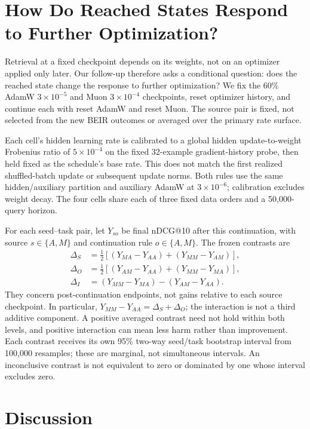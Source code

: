 \documentclass[11pt]{article}
\begin{document}
\section{How Do Reached States Respond to Further Optimization?}

Retrieval at a fixed checkpoint depends on its weights, not on an optimizer applied only later.
Our follow-up therefore asks a conditional question: does the reached state change the response to
further optimization? We fix the 60\% AdamW $3\!\times\!10^{-5}$ and Muon $3\!\times\!10^{-4}$
checkpoints, reset optimizer history, and continue each with reset AdamW and reset Muon. The source
pair is fixed, not selected from the new BEIR outcomes or averaged over the primary rate surface.

Each cell's hidden learning rate is calibrated to a global hidden update-to-weight Frobenius ratio
of $5\!\times\!10^{-4}$ on the fixed 32-example gradient-history probe, then held fixed as the
schedule's base rate. This does not match the first realized shuffled-batch update or subsequent
update norms. Both rules use the same hidden/auxiliary partition and auxiliary AdamW at
$3\!\times\!10^{-6}$; calibration excludes weight decay. The four cells share each of three fixed
data orders and a 50,000-query horizon.

For each seed--task pair, let $Y_{so}$ be final nDCG@10 after this continuation, with source
$s\in\{A,M\}$ and continuation rule $o\in\{A,M\}$. The frozen contrasts are
\begin{align}
\Delta_S &= \tfrac12[(Y_{MA}-Y_{AA})+(Y_{MM}-Y_{AM})],\\
\Delta_O &= \tfrac12[(Y_{AM}-Y_{AA})+(Y_{MM}-Y_{MA})],\\
\Delta_I &= (Y_{MM}-Y_{MA})-(Y_{AM}-Y_{AA}).
\end{align}
They concern post-continuation endpoints, not gains relative to each source checkpoint. In
particular, $Y_{MM}-Y_{AA}=\Delta_S+\Delta_O$; the interaction is not a third additive component.
A positive averaged contrast need not hold within both levels, and positive interaction can mean
less harm rather than improvement. Each contrast receives its own 95\% two-way seed/task bootstrap
interval from 100,000 resamples; these are marginal, not simultaneous intervals. An inconclusive
contrast is not equivalent to zero or dominated by one whose interval excludes zero.

\StateOperatorMechanismFinding

\section{Discussion}
\end{document}
